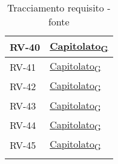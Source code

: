 \begin{longtable}{|>{\centering\arraybackslash}m{}|>{\centering\arraybackslash}m{}|}
	RV-40              & \href{https://7last.github.io/docs/rtb/documentazione-interna/glossario\#capitolato}{Capitolato\textsubscript{G}}                                                                                                                                    \\\hline
	RV-41              & \href{https://7last.github.io/docs/rtb/documentazione-interna/glossario\#capitolato}{Capitolato\textsubscript{G}}                                                                                                                                    \\\hline
	RV-42              & \href{https://7last.github.io/docs/rtb/documentazione-interna/glossario\#capitolato}{Capitolato\textsubscript{G}}                                                                                                                                    \\\hline
	RV-43              & \href{https://7last.github.io/docs/rtb/documentazione-interna/glossario\#capitolato}{Capitolato\textsubscript{G}}                                                                                                                                    \\\hline
	RV-44              & \href{https://7last.github.io/docs/rtb/documentazione-interna/glossario\#capitolato}{Capitolato\textsubscript{G}}                                                                                                                                    \\\hline
	RV-45              & \href{https://7last.github.io/docs/rtb/documentazione-interna/glossario\#capitolato}{Capitolato\textsubscript{G}}                                                                                                                                    \\\hline
	\caption{Tracciamento requisito - fonte}
	\label{table:4}
\end{longtable}

